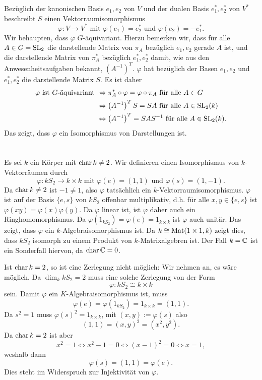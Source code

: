 \documentclass[a4paper,10pt]{article}
\begin{document}
Bezüglich der kanonischen Basis $e_1, e_2$ von $V$ und der dualen Basis $e_1^*, e_2^*$ von $V^*$ beschreibt $S$ einen Vektorraumisomorphismus
\[
 \varphi : V \to V^* \text{ mit } \varphi(e_1) =  e_2^* \text{ und } \varphi(e_2) = -e_1^*.
\]
Wir behaupten, dass $\varphi$ $G$-äquivariant. Hierzu bemerken wir, dass für alle $A \in G = \operatorname{SL}_2$ die darstellende Matrix von $\pi_A$ bezüglich $e_1, e_2$ gerade $A$ ist, und die darstellende Matrix von $\pi^*_A$ bezüglich $e_1^*, e_2^*$ damit, wie aus den Anwesenheitsaufgaben bekannt, $(A^{-1})^T$. $\varphi$ hat bezüglich der Basen $e_1, e_2$ und $e_1^*, e_2^*$ die darstellende Matrix $S$. Es ist daher
\begin{align*}
 \varphi \text{ ist $G$-äquivariant }
 &\Leftrightarrow \pi^*_A \circ \varphi = \varphi \circ \pi_A \text{ für alle } A \in G \\
 &\Leftrightarrow \left(A^{-1}\right)^T S = S A \text{ für alle } A \in \operatorname{SL}_2(k) \\
 &\Leftrightarrow \left(A^{-1}\right)^T = S A S^{-1} \text{ für alle } A \in \operatorname{SL}_2(k).
\end{align*}
Das zeigt, dass $\varphi$ ein Isomorphismus von Darstellungen ist.





\section{}
Es sei $k$ ein Körper mit $\operatorname{char} k \neq 2$. Wir definieren einen Isomorphismus von $k$-Vektorräumen durch
\[
 \varphi: k S_2 \to k \times k \text{ mit } \varphi(e) = (1,1) \text{ und } \varphi(s) = (1,-1).
\]
Da $\operatorname{char} k \neq 2$ ist $-1 \neq 1$, also $\varphi$ tatsächlich ein $k$-Vektorraumisomorphismus. $\varphi$ ist auf der Basis $\{e,s\}$ von $k S_2$ offenbar multiplikativ, d.h. für alle $x,y \in \{e,s\}$ ist $\varphi(xy) = \varphi(x)\varphi(y)$. Da $\varphi$ linear ist, ist $\varphi$ daher auch ein Ringhomomorphismus. Da $\varphi(1_{k S_2}) = \varphi(e) = 1_{k \times k}$ ist $\varphi$ auch unitär. Das zeigt, dass $\varphi$ ein $k$-Algebra\-iso\-morph\-is\-mus ist. Da $k \cong \operatorname{Mat}(1 \times 1, k)$ zeigt dies, dass $k S_2$ isomorph zu einem Produkt von $k$-Matrixalgebren ist. Der Fall $k = \mathbb{C}$ ist ein Sonderfall hiervon, da $\operatorname{char} \mathbb{C} = 0$.

Ist $\operatorname{char} k = 2$, so ist eine Zerlegung nicht möglich: Wir nehmen an, es wäre möglich. Da $\dim_k kS_2 = 2$ muss eine solche Zerlegung von der Form
\[
 \varphi : k S_2 \cong k \times k
\]
sein. Damit $\varphi$ ein $K$-Algebraisomorphismus ist, muss
\[
 \varphi(e) = \varphi(1_{kS_2}) = 1_{k \times k} = (1,1).
\]
Da $s^2 = 1$ muss $\varphi(s)^2 = 1_{k \times k}$, mit $(x,y) := \varphi(s)$ also
\[
 (1,1) = (x,y)^2 = (x^2,y^2).
\]
Da $\operatorname{char} k = 2$ ist aber
\[
 x^2 = 1 \Leftrightarrow x^2 -1 = 0 \Leftrightarrow (x-1)^2 = 0 \Leftrightarrow x = 1,
\]
weshalb dann
\[
 \varphi(s) = (1,1) = \varphi(e).
\]
Dies steht im Widerspruch zur Injektivität von $\varphi$.
\end{document}
